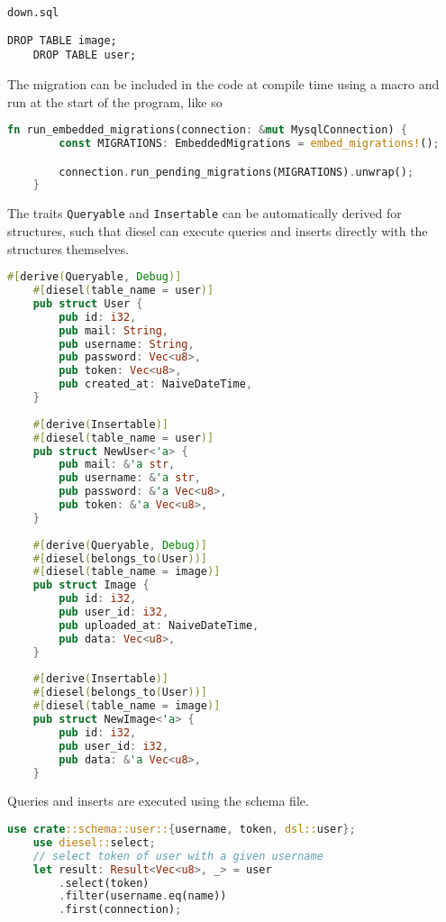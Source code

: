 \documentclass[../documentation.tex]{subfiles}
\begin{document}
\texttt{down.sql}
\begin{lstlisting}[style=sql]
    DROP TABLE image;
    DROP TABLE user;
\end{lstlisting}

The migration can be included in the code at compile time using a macro and run
at the start of the program, like so
\begin{lstlisting}[language=Rust, style=boxed, numbers=none]
    fn run_embedded_migrations(connection: &mut MysqlConnection) {
        const MIGRATIONS: EmbeddedMigrations = embed_migrations!();

        connection.run_pending_migrations(MIGRATIONS).unwrap();
    }
\end{lstlisting}

The traits \texttt{Queryable} and \texttt{Insertable} can be automatically derived
for structures, such that diesel can execute queries and inserts directly with the structures
themselves.

\begin{lstlisting}[language=Rust, style=boxed, numbers=none]
    #[derive(Queryable, Debug)]
    #[diesel(table_name = user)]
    pub struct User {
        pub id: i32,
        pub mail: String,
        pub username: String,
        pub password: Vec<u8>,
        pub token: Vec<u8>,
        pub created_at: NaiveDateTime,
    }
    
    #[derive(Insertable)]
    #[diesel(table_name = user)]
    pub struct NewUser<'a> {
        pub mail: &'a str,
        pub username: &'a str,
        pub password: &'a Vec<u8>,
        pub token: &'a Vec<u8>,
    }
    
    #[derive(Queryable, Debug)]
    #[diesel(belongs_to(User))]
    #[diesel(table_name = image)]
    pub struct Image {
        pub id: i32,
        pub user_id: i32,
        pub uploaded_at: NaiveDateTime,
        pub data: Vec<u8>,
    }
    
    #[derive(Insertable)]
    #[diesel(belongs_to(User))]
    #[diesel(table_name = image)]
    pub struct NewImage<'a> {
        pub id: i32,
        pub user_id: i32,
        pub data: &'a Vec<u8>,
    }
\end{lstlisting}

Queries and inserts are executed using the schema file.

\begin{lstlisting}[language=Rust, style=boxed, numbers=none]
    use crate::schema::user::{username, token, dsl::user};
    use diesel::select;
    // select token of user with a given username
    let result: Result<Vec<u8>, _> = user
        .select(token)
        .filter(username.eq(name))
        .first(connection);
\end{lstlisting}
\end{document}
